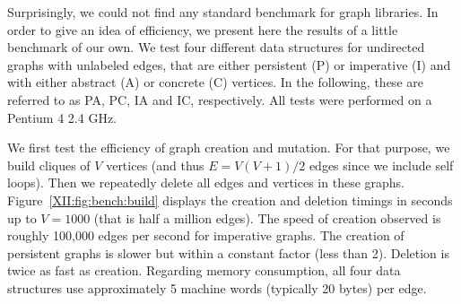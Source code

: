 Surprisingly, we could not find any standard benchmark for graph
libraries. In order to give an idea of \ocamlgraph efficiency, we
present here the results of a little benchmark of our own.  We test
four different data structures for undirected graphs with unlabeled
edges, that are either persistent (P) or imperative (I) and with
either abstract (A) or concrete (C) vertices. In the following, these
are referred to as PA, PC, IA and IC, respectively.  All tests were
performed on a Pentium 4 2.4 GHz.

We first test the efficiency of graph creation and mutation.  For that
purpose, we build cliques of $V$ vertices (and thus $E=V(V+1)/2$
edges since we include self loops).  Then we repeatedly delete all
edges and vertices in these graphs.  Figure~\ref{XII:fig:bench:build}
displays the creation and deletion timings in seconds up to $V=1000$
(that is half a million edges).  The speed of creation observed is
roughly 100,000 edges per second for imperative graphs. The creation
of persistent graphs is slower but within a constant factor (less than
2). Deletion is twice as fast as creation.  Regarding memory
consumption, all four data structures use approximately 5 machine words
(typically 20 bytes) per edge.

